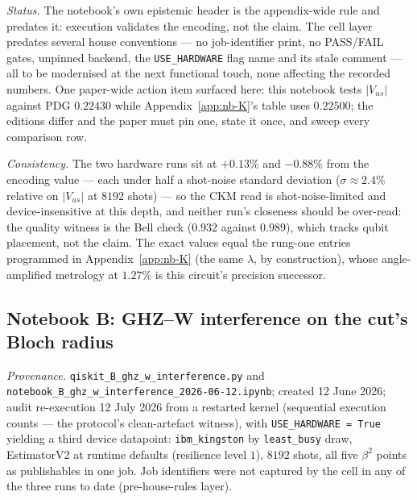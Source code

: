 \emph{Status.} The notebook's own epistemic header is the appendix-wide rule and predates it:
execution validates the encoding, not the claim. The cell layer predates several house
conventions --- no job-identifier print, no PASS/FAIL gates, unpinned backend, the
\texttt{USE\_HARDWARE} flag name and its stale comment --- all to be modernised at the next
functional touch, none affecting the recorded numbers. One paper-wide action item surfaced here:
this notebook tests $\lvert V_{us}\rvert$ against PDG $0.22430$ while
Appendix~\ref{app:nb-K}'s table uses $0.22500$; the editions differ and the paper must pin one,
state it once, and sweep every comparison row.

\emph{Consistency.} The two hardware runs sit at $+0.13\%$ and $-0.88\%$ from the encoding value
--- each under half a shot-noise standard deviation ($\sigma \approx 2.4\%$ relative on
$\lvert V_{us}\rvert$ at $8192$ shots) --- so the CKM read is shot-noise-limited and
device-insensitive at this depth, and neither run's closeness should be over-read: the quality
witness is the Bell check ($0.932$ against $0.989$), which tracks qubit placement, not the claim.
The exact values equal the rung-one entries programmed in Appendix~\ref{app:nb-K} (the same
$\lambda$, by construction), whose angle-amplified metrology at $1.27\%$ is this circuit's
precision successor.

\subsection{Notebook B: GHZ--W interference on the cut's Bloch radius}
\label{app:nb-B}

\emph{Provenance.} \texttt{qiskit\_B\_ghz\_w\_interference.py} and
\texttt{notebook\_B\_ghz\_w\_interference\_2026-06-12.ipynb}; created 12 June 2026; audit
re-execution 12 July 2026 from a restarted kernel (sequential execution counts --- the protocol's
clean-artefact witness), with \texttt{USE\_HARDWARE = True} yielding a third device datapoint:
\texttt{ibm\_kingston} by \texttt{least\_busy} draw, EstimatorV2 at runtime defaults (resilience
level $1$), $8192$ shots, all five $\beta^{2}$ points as publishables in one job. Job identifiers
were not captured by the cell in any of the three runs to date (pre-house-rules layer).

